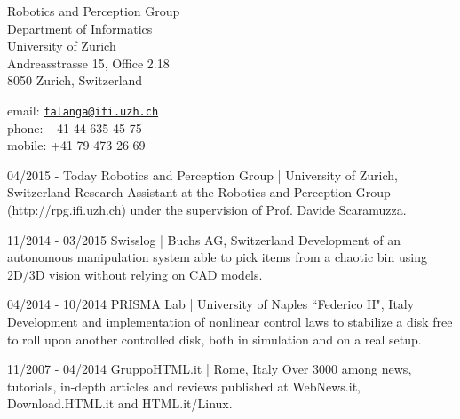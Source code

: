 \documentclass{DFCV}
\begin{document}
\begin{minipage}{\textwidth}
	\begin{minipage}[c]{.6\textwidth}
		Robotics and Perception Group \\
		Department of Informatics \\
		University of Zurich \\
		Andreasstrasse 15, Office 2.18\\
	    8050 Zurich, Switzerland
	\end{minipage}
	\begin{minipage}[b]{.4\textwidth}
	    \flushleft
	                email: \texttt{\href{mailto:falanga@ifi.uzh.ch}{falanga@ifi.uzh.ch}} \\
		            phone: +41 44 635 45 75 \\
		            mobile: +41 79 473 26 69
	\end{minipage}
\end{minipage}

	
			  {04/2015 - Today}
			  {Robotics and Perception Group | University of Zurich, Switzerland}
			  {Research Assistant at the Robotics and Perception Group (http://rpg.ifi.uzh.ch) under the supervision of Prof. Davide Scaramuzza.}
		  
	          {11/2014 - 03/2015}
	          {Swisslog | Buchs AG, Switzerland}
	          {Development of an autonomous manipulation system able to pick items from a chaotic bin using 2D/3D vision without relying on CAD models.}
		  		      
			  {04/2014 - 10/2014}
			  {PRISMA Lab | University of Naples ``Federico II", Italy}
			  {Development and implementation of nonlinear control laws to stabilize a disk free to roll upon another controlled disk, both in simulation and on a real setup.}
				   
			  {11/2007 - 04/2014}
			  {GruppoHTML.it | Rome, Italy}
			  {Over 3000 among news, tutorials, in-depth articles and reviews published at WebNews.it, Download.HTML.it and HTML.it/Linux.}
		   
\end{document}
